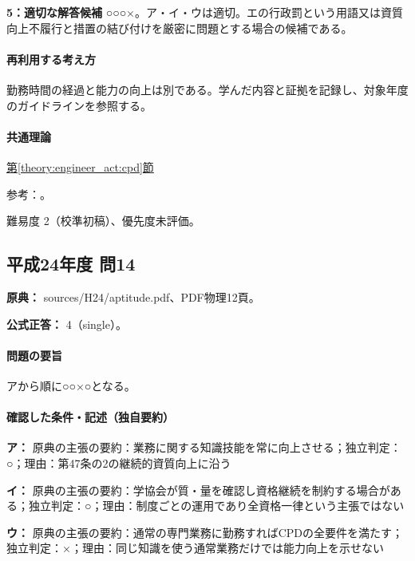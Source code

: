 \noindent\textbf{5：適切な解答候補} ○○○×。ア・イ・ウは適切。エの行政罰という用語又は資質向上不履行と措置の結び付けを厳密に問題とする場合の候補である。\par

\paragraph{再利用する考え方} 勤務時間の経過と能力の向上は別である。学んだ内容と証拠を記録し、対象年度のガイドラインを参照する。

\paragraph{共通理論} \hyperref[theory:engineer_act:cpd]{第\ref*{theory:engineer_act:cpd}節}

\par 参考：\cite{engineer_act_current,cpd_v1}。

\par 難易度 2（校準初稿）、優先度未評価。

\subsection{平成24年度 問14}
\label{q:h24-reg-apt-14}

\noindent\textbf{原典：} sources/H24/aptitude.pdf、PDF物理12頁。

\textbf{公式正答：} 4（single）。

\paragraph{問題の要旨} アから順に○○×○となる。

\paragraph{確認した条件・記述（独自要約）}\mbox{}\par

\noindent\textbf{ア：} 原典の主張の要約：業務に関する知識技能を常に向上させる；独立判定：○；理由：第47条の2の継続的資質向上に沿う\par

\noindent\textbf{イ：} 原典の主張の要約：学協会が質・量を確認し資格継続を制約する場合がある；独立判定：○；理由：制度ごとの運用であり全資格一律という主張ではない\par

\noindent\textbf{ウ：} 原典の主張の要約：通常の専門業務に勤務すればCPDの全要件を満たす；独立判定：×；理由：同じ知識を使う通常業務だけでは能力向上を示せない\par

